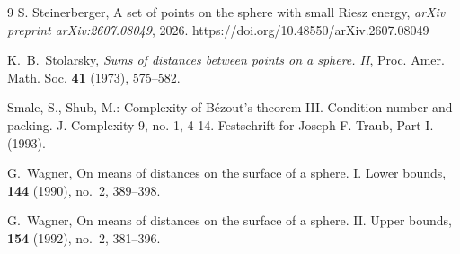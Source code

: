 \documentclass[11pt]{amsart}
\begin{document}
\begin{thebibliography}{9}
S. Steinerberger,
A set of points on the sphere with small Riesz energy,
\textit{arXiv preprint arXiv:2607.08049}, 2026.
https://doi.org/10.48550/arXiv.2607.08049

K.~B.~Stolarsky, \emph{Sums of distances between points on a sphere. II},
Proc. Amer. Math. Soc. \textbf{41} (1973), 575--582.

 Smale, S., Shub, M.: Complexity of B\'ezout's theorem III. Condition number and packing. J. Complexity 9, no. 1, 4-14. Festschrift for Joseph F. Traub, Part I. (1993).


 G.~Wagner, \newblock On means of distances on the surface of a sphere. I. Lower bounds,  \textbf{144} (1990), no.~2, 389--398.

 G.~Wagner, \newblock On means of distances on the surface of a sphere. II. Upper bounds,  \textbf{154} (1992), no.~2, 381--396.


\end{thebibliography}
\end{document}
